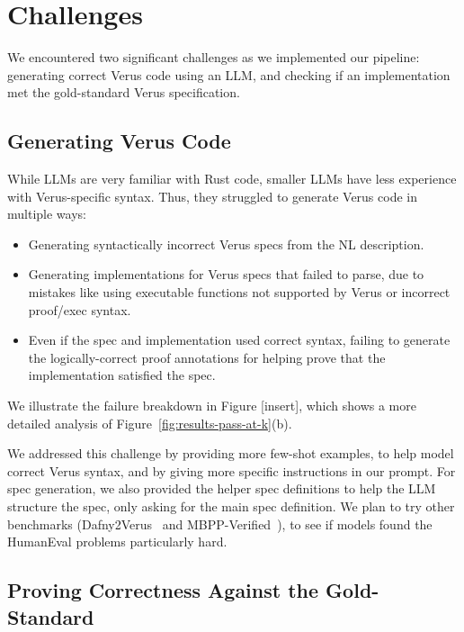 \section{Challenges}
\label{challenges}

We encountered two significant challenges as we implemented our pipeline:
generating correct Verus code using an LLM, 
and checking if an implementation met the gold-standard Verus specification. 

\subsection{Generating Verus Code}

While LLMs are very familiar with Rust code, 
smaller LLMs have less experience with Verus-specific syntax.
Thus, they struggled to generate Verus code in multiple ways:
\begin{itemize}
    \item Generating syntactically incorrect 
    Verus specs from the NL description.
    \item Generating implementations for Verus specs that failed to parse,
    due to mistakes like using executable functions not supported by Verus
    or incorrect proof/exec syntax.
    \item Even if the spec and implementation used correct syntax,
    failing to generate the logically-correct proof annotations 
    for helping prove that the implementation satisfied the spec.
\end{itemize}
We illustrate the failure breakdown in Figure [insert], 
which shows a more detailed analysis of Figure~\ref{fig:results-pass-at-k}(b).

We addressed this challenge by providing more few-shot examples,
to help model correct Verus syntax,
and by giving more specific instructions in our prompt. 
For spec generation, we also provided the helper spec definitions to help the LLM structure the spec,
only asking for the main spec definition.
We plan to try other benchmarks
(Dafny2Verus~\cite{alphaverus} and MBPP-Verified~\cite{austin2021programsynthesislargelanguage}), 
to see if models found the HumanEval problems particularly hard.

\subsection{Proving Correctness Against the Gold-Standard}

